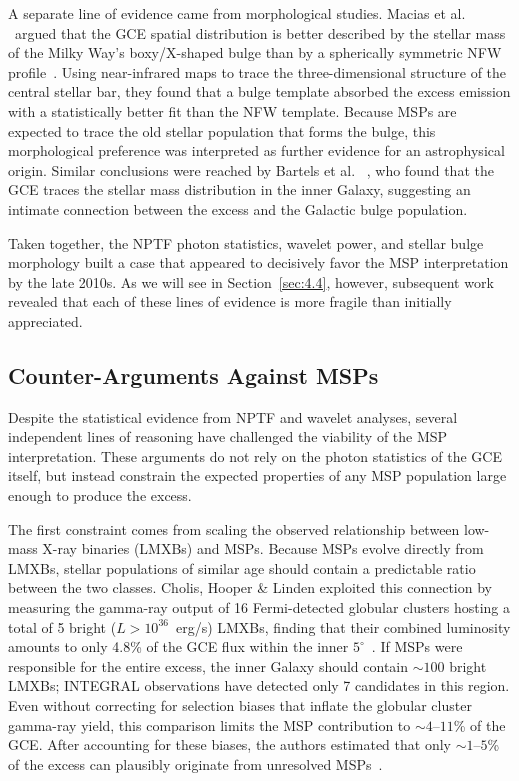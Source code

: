 A separate line of evidence came from morphological studies.
Macias et al.
\ argued that the GCE spatial distribution is better described by the stellar mass of the Milky Way's boxy/X-shaped bulge than by a spherically symmetric NFW profile~\cite{Macias:2016nev, Macias:2019omb}.
Using near-infrared maps to trace the three-dimensional structure of the central stellar bar, they found that a bulge template absorbed the excess emission with a statistically better fit than the NFW template.
Because MSPs are expected to trace the old stellar population that forms the bulge, this morphological preference was interpreted as further evidence for an astrophysical origin.
Similar conclusions were reached by Bartels et al.
\ \cite{Bartels:2018xom}, who found that the GCE traces the stellar mass distribution in the inner Galaxy, suggesting an intimate connection between the excess and the Galactic bulge population.

Taken together, the NPTF photon statistics, wavelet power, and stellar bulge morphology built a case that appeared to decisively favor the MSP interpretation by the late 2010s.
As we will see in Section~\ref{sec:4.4}, however, subsequent work revealed that each of these lines of evidence is more fragile than initially appreciated.

\subsection{Counter-Arguments Against MSPs}
\label{sec:4.3.3}

Despite the statistical evidence from NPTF and wavelet analyses, several independent lines of reasoning have challenged the viability of the MSP interpretation.
These arguments do not rely on the photon statistics of the GCE itself, but instead constrain the expected properties of any MSP population large enough to produce the excess.

The first constraint comes from scaling the observed relationship between low-mass X-ray binaries (LMXBs) and MSPs.
Because MSPs evolve directly from LMXBs, stellar populations of similar age should contain a predictable ratio between the two classes.
Cholis, Hooper \& Linden exploited this connection by measuring the gamma-ray output of 16 Fermi-detected globular clusters hosting a total of 5 bright ($L > 10^{36}$~erg/s) LMXBs, finding that their combined luminosity amounts to only 4.8\% of the GCE flux within the inner $5^\circ$~\cite{Cholis:2014lta}.
If MSPs were responsible for the entire excess, the inner Galaxy should contain $\sim 100$ bright LMXBs; INTEGRAL observations have detected only 7 candidates in this region.
Even without correcting for selection biases that inflate the globular cluster gamma-ray yield, this comparison limits the MSP contribution to $\sim 4$--$11$\% of the GCE.
After accounting for these biases, the authors estimated that only $\sim 1$--$5$\% of the excess can plausibly originate from unresolved MSPs~\cite{Cholis:2014lta}.

